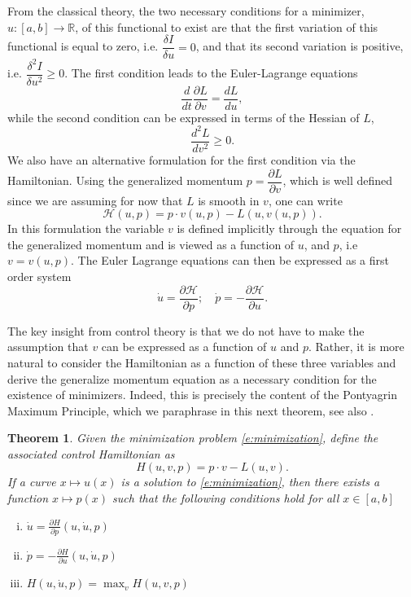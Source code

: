 \documentclass[11pt]{article}
\newcommand{\R}{\mathbb{R}}
\theoremstyle{plain}
\newtheorem{Theorem}{Theorem}
\begin{document}
From the classical theory, the two necessary conditions for a minimizer, $u: [a,b] \rightarrow \R$, of this functional to exist are that the first variation of this functional is equal to zero, i.e. $\dfrac{\delta I}{\delta u} =0$, and that its second variation is positive, i.e. $\dfrac{\delta^2 I}{\delta u^2}\geq 0$. The first condition leads to the Euler-Lagrange equations
\[ \frac{d}{dt} \frac{\partial L}{\partial v}  = \frac{d L}{du},\]
while the second condition can be expressed in terms of the Hessian of $L$,
\[ \frac{d^2 L }{dv^2} \geq 0.\]
We also have an alternative formulation for the first condition via the Hamiltonian. Using the generalized momentum $p = \dfrac{\partial L}{\partial v}$, which is well defined since we are assuming for now that $L$ is smooth in $v$, one can write
\[ \mathcal{H}(u,p) = p \cdot v(u,p) - L(u,v(u,p)).\]
In this formulation the variable $v$ is defined implicitly through the equation for the generalized momentum and is viewed as a function of $u$, and $p$, i.e $v = v(u,p)$. The Euler Lagrange equations can then be expressed as a first order system
\[ \dot{u} = \frac{\partial \mathcal{H}}{\partial p} ; \quad \dot{p} = - \frac{\partial \mathcal{H}}{\partial u}. \]

The key insight from control theory is that we do not have to make the assumption that $v$ can be expressed as a function of $u$ and $p$. Rather, it is more natural to consider the Hamiltonian as a function of these three variables and derive the generalize momentum equation as a necessary condition for the existence of minimizers. Indeed, this is precisely the content of the Pontyagrin Maximum Principle, which we paraphrase in this next theorem, see also \cite{sussmann1997}.

\begin{Theorem}\label{t:controlH}
Given the minimization problem \eqref{e:minimization}, define the associated control Hamiltonian as
\[ H(u,v,p) = p\cdot v - L(u,v).\]
If a curve $x \mapsto u(x)$ is a solution to \eqref{e:minimization}, then there exists a function $x \mapsto p(x)$ such that the following conditions hold for all $x \in [a,b]$
\begin{enumerate}[i)]
\item $ \dot{u} = \frac{\partial H}{\partial p}( u, \dot{u},p)$
\item $ \dot{p} = -\frac{\partial H}{\partial u} ( u, \dot{u},p)$
\item $ H(u,\dot{u},p) = \max_v H(u,v,p)$
\end{enumerate}

\end{Theorem}
\end{document}
